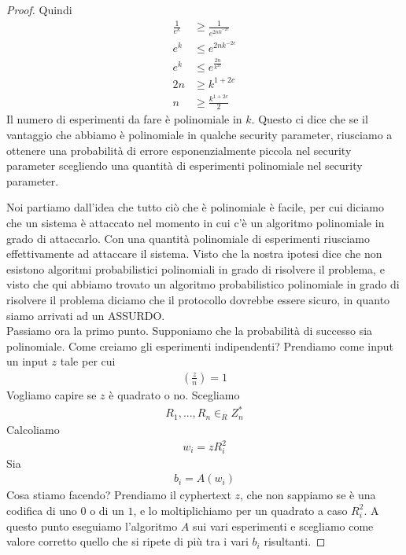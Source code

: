 \begin{proof}
Quindi 
\begin{align*}
    \frac{1}{e^k} &\ge \frac{1}{e^{2nk^{-2c}}}\\
    e^k &\le e^{2nk^{-2c}}\\
    e^k &\le e^{\frac{2n}{k^{2c}}}\\
    2n &\ge k^{1+2c}\\
    n &\ge \frac{k^{1+2c}}{2}
\end{align*}
\noindent Il numero di esperimenti da fare è polinomiale in $k$. Questo ci dice che se il vantaggio che abbiamo è polinomiale in qualche security parameter, riusciamo a ottenere una probabilità di errore esponenzialmente piccola nel security parameter scegliendo una quantità di esperimenti polinomiale nel security parameter. 

Noi partiamo dall'idea che tutto ciò che è polinomiale è facile, per cui diciamo che un sistema è attaccato nel momento in cui c'è un algoritmo polinomiale in grado di attaccarlo. Con una quantità polinomiale di esperimenti riusciamo effettivamente ad attaccare il sistema. 
Visto che la nostra ipotesi dice che non esistono algoritmi probabilistici polinomiali in grado di risolvere il problema, e visto che qui abbiamo trovato un algoritmo probabilistico polinomiale in grado di risolvere il problema diciamo che il protocollo dovrebbe essere sicuro, in quanto siamo arrivati ad un ASSURDO.\\

\noindent Passiamo ora la primo punto. Supponiamo che la probabilità di successo sia polinomiale. Come creiamo gli esperimenti indipendenti? Prendiamo come input un input $z$ tale per cui
\begin{align*}
    \left( \frac{z}{n}\right) = 1
\end{align*}
\noindent Vogliamo capire se $z$ è quadrato o no. Scegliamo
\begin{align*}
    R_1, ..., R_n \in_R Z_n^*
\end{align*}
\noindent Calcoliamo 
\begin{align*}
    w_i = zR_i^2
\end{align*}
\noindent Sia
\begin{align*}
    b_i = A(w_i)
\end{align*}
\noindent Cosa stiamo facendo? Prendiamo il cyphertext $z$, che non sappiamo se è una codifica di uno $0$ o di un $1$, e lo moltiplichiamo per un quadrato a caso $R_i^2$. A questo punto eseguiamo l'algoritmo $A$ sui vari esperimenti e scegliamo come valore corretto quello che si ripete di più tra i vari $b_i$ risultanti.


\end{proof}
